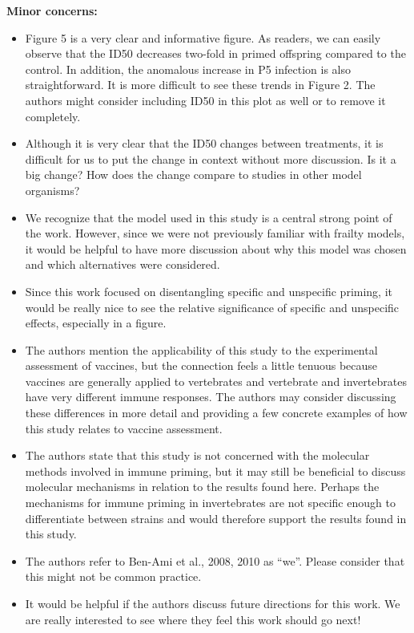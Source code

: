 \documentclass[10pt]{article}
\providecommand{\tightlist}{\setlength{\itemsep}{0pt}\setlength{\parskip}{0pt}}%
\begin{document}
\textbf{Minor concerns:}

\begin{itemize}
\tightlist
\item
  Figure 5 is a very clear and informative figure. As readers, we can
  easily observe that the ID50 decreases two-fold in primed offspring
  compared to the control. In addition, the anomalous increase in P5
  infection is also straightforward. It is more difficult to see these
  trends in Figure 2. The authors might consider including ID50 in this
  plot as well or to remove it completely.
\item
  Although it is very clear that the ID50 changes between treatments, it
  is difficult for us to put the change in context without more
  discussion. Is it a big change? How does the change compare to studies
  in other model organisms?
\item
  We recognize that the model used in this study is a central strong
  point of the work. However, since we were not previously familiar with
  frailty models, it would be helpful to have more discussion about why
  this model was chosen and which alternatives were considered.~~
\item
  Since this work focused on disentangling specific and unspecific
  priming, it would be really nice to see the relative significance of
  specific and unspecific effects, especially in a figure.
\item
  The authors mention the applicability of this study to the
  experimental assessment of vaccines, but the connection feels a little
  tenuous because vaccines are generally applied to vertebrates and
  vertebrate and invertebrates have very different immune responses. The
  authors may consider discussing these differences in more detail and
  providing a few concrete examples of how this study relates to vaccine
  assessment.~
\item
  The authors state that this study is not concerned with the molecular
  methods involved in immune priming, but it may still be beneficial to
  discuss molecular mechanisms in relation to the results found here.
  Perhaps the mechanisms for immune priming in invertebrates are not
  specific enough to differentiate between strains and would therefore
  support the results found in this study.~
\item
  The authors refer to Ben-Ami et al., 2008, 2010 as ``we''. Please
  consider that this might not be common practice.
\item
  It would be helpful if the authors discuss future directions for this
  work. We are really interested to see where they feel this work should
  go next!~
\end{itemize}
\end{document}
